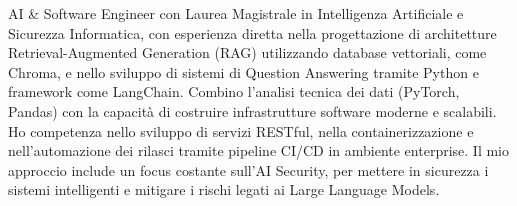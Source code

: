 

\begin{cvparagraph}

AI \& Software Engineer con Laurea Magistrale in Intelligenza Artificiale e Sicurezza Informatica, con esperienza diretta nella progettazione di architetture Retrieval-Augmented Generation (RAG) utilizzando database vettoriali, come Chroma, e nello sviluppo di sistemi di Question Answering tramite Python e framework come LangChain. Combino l'analisi tecnica dei dati (PyTorch, Pandas) con la capacità di costruire infrastrutture software moderne e scalabili. Ho competenza nello sviluppo di servizi RESTful, nella containerizzazione e nell'automazione dei rilasci tramite pipeline CI/CD in ambiente enterprise. Il mio approccio include un focus costante sull'AI Security, per mettere in sicurezza i sistemi intelligenti e mitigare i rischi legati ai Large Language Models.
\end{cvparagraph}
